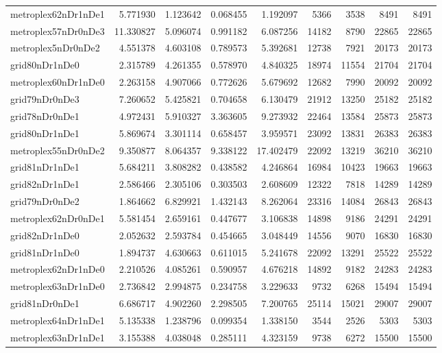 \begin{longtable}{|l|r|r|r|r|r|r|r|r|}
metroplex62nDr1nDe1 & 5.771930 & 1.123642 & 0.068455 & 1.192097 & 5366 & 3538 & 8491 & 8491 \\
metroplex57nDr0nDe3 & 11.330827 & 5.096074 & 0.991182 & 6.087256 & 14182 & 8790 & 22865 & 22865 \\
metroplex5nDr0nDe2 & 4.551378 & 4.603108 & 0.789573 & 5.392681 & 12738 & 7921 & 20173 & 20173 \\
grid80nDr1nDe0 & 2.315789 & 4.261355 & 0.578970 & 4.840325 & 18974 & 11554 & 21704 & 21704 \\
metroplex60nDr1nDe0 & 2.263158 & 4.907066 & 0.772626 & 5.679692 & 12682 & 7990 & 20092 & 20092 \\
grid79nDr0nDe3 & 7.260652 & 5.425821 & 0.704658 & 6.130479 & 21912 & 13250 & 25182 & 25182 \\
grid78nDr0nDe1 & 4.972431 & 5.910327 & 3.363605 & 9.273932 & 22464 & 13584 & 25873 & 25873 \\
grid80nDr1nDe1 & 5.869674 & 3.301114 & 0.658457 & 3.959571 & 23092 & 13831 & 26383 & 26383 \\
metroplex55nDr0nDe2 & 9.350877 & 8.064357 & 9.338122 & 17.402479 & 22092 & 13219 & 36210 & 36210 \\
grid81nDr1nDe1 & 5.684211 & 3.808282 & 0.438582 & 4.246864 & 16984 & 10423 & 19663 & 19663 \\
grid82nDr1nDe1 & 2.586466 & 2.305106 & 0.303503 & 2.608609 & 12322 & 7818 & 14289 & 14289 \\
grid79nDr0nDe2 & 1.864662 & 6.829921 & 1.432143 & 8.262064 & 23316 & 14084 & 26843 & 26843 \\
metroplex62nDr0nDe1 & 5.581454 & 2.659161 & 0.447677 & 3.106838 & 14898 & 9186 & 24291 & 24291 \\
grid82nDr1nDe0 & 2.052632 & 2.593784 & 0.454665 & 3.048449 & 14556 & 9070 & 16830 & 16830 \\
grid81nDr1nDe0 & 1.894737 & 4.630663 & 0.611015 & 5.241678 & 22092 & 13291 & 25522 & 25522 \\
metroplex62nDr1nDe0 & 2.210526 & 4.085261 & 0.590957 & 4.676218 & 14892 & 9182 & 24283 & 24283 \\
metroplex63nDr1nDe0 & 2.736842 & 2.994875 & 0.234758 & 3.229633 & 9732 & 6268 & 15494 & 15494 \\
grid81nDr0nDe1 & 6.686717 & 4.902260 & 2.298505 & 7.200765 & 25114 & 15021 & 29007 & 29007 \\
metroplex64nDr1nDe1 & 5.135338 & 1.238796 & 0.099354 & 1.338150 & 3544 & 2526 & 5303 & 5303 \\
metroplex63nDr1nDe1 & 3.155388 & 4.038048 & 0.285111 & 4.323159 & 9738 & 6272 & 15500 & 15500 \\

\end{longtable}
